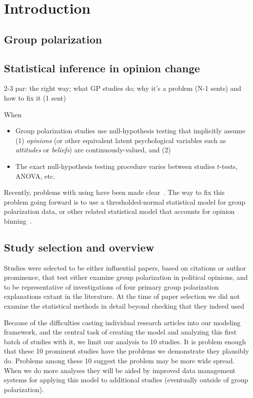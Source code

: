 \documentclass[12pt, letterpaper]{article}
\begin{document}
\section{Introduction}


\subsection{Group polarization}

\subsection{Statistical inference in opinion change}

2-3 par: the right way; what GP studies do; why it's a problem (N-1 sents) and how
to fix it (1 sent)

When 


\begin{itemize}
  \item 
    Group polarization studies use null-hypothesis testing that implicitly
    assume (1) \emph{opinions} (or other equivalent latent psychological variables
    such as \emph{attitudes} or \emph{beliefs}) are continuously-valued, and
    (2) 
  \item
    The exact null-hypothesis testing procedure varies between studies $t$-tests, ANOVA, etc. 
\end{itemize}

Recently, problems with using have been made clear~\cite{Liddell2018}.
The way to fix this problem going forward is to use a thresholded-normal 
statistical model for group polarization data, or other related statistical 
model that accounts for opinion binning~\cite[Ch. 23]{Liddell2018,KruschkeDBDA}.

\subsection{Study selection and overview}

Studies were selected to be either influential papers, based on citations or
author prominence, that test either examine
group polarization in political opinions, and to be representative of investigations
of four primary group polarization explanations extant in the literature.
At the time of paper selection we did not examine the statistical methods in detail beyond
checking that they indeed used 

Because of the difficulties casting individual research articles into our modeling
framework, and the central task of creating the model and analyzing this first
batch of studies with it, we limit our analysis to 10 studies. It is problem
enough that these 10 prominent studies have the problems we demonstrate they
plausibly do. Problems among these 10 suggest the problem may be more wide spread. 
When we do more analyses
they will be aided by improved data management systems for applying this model to 
additional studies (eventually outside of group polarization).
\end{document}
